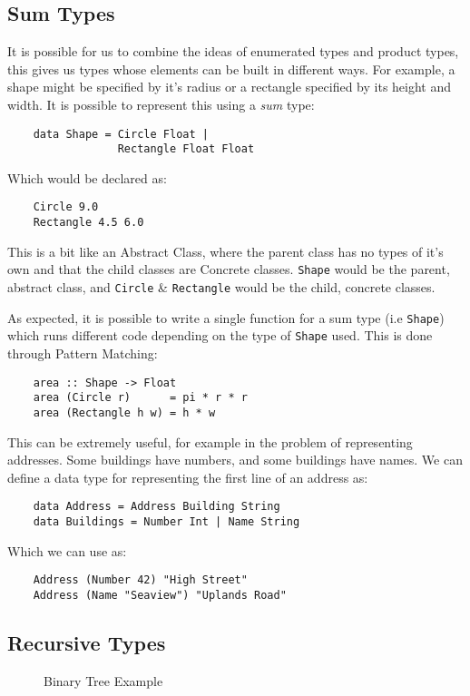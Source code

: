 \subsection{Sum Types}
It is possible for us to combine the ideas of enumerated types and product types, this gives us types whose elements can be built in different ways. For example, a shape might be specified by it's radius or a rectangle specified by its height and width. It is possible to represent this using a \textit{sum} type:
\begin{verbatim}
    data Shape = Circle Float |
                 Rectangle Float Float
\end{verbatim}
Which would be declared as:
\begin{verbatim}
    Circle 9.0
    Rectangle 4.5 6.0
\end{verbatim}

This is a bit like an Abstract Class, where the parent class has no types of it's own and that the child classes are Concrete classes. \verb|Shape| would be the parent, abstract class, and \verb|Circle| \& \verb|Rectangle| would be the child, concrete classes. 

As expected, it is possible to write a single function for a sum type (i.e \verb|Shape|) which runs different code depending on the type of \verb|Shape| used. This is done through Pattern Matching:
\begin{verbatim}
    area :: Shape -> Float
    area (Circle r)      = pi * r * r
    area (Rectangle h w) = h * w
\end{verbatim}

This can be extremely useful, for example in the problem of representing addresses. Some buildings have numbers, and some buildings have names. We can define a data type for representing the first line of an address as:
\begin{verbatim}
    data Address = Address Building String
    data Buildings = Number Int | Name String
\end{verbatim}
Which we can use as:
\begin{verbatim}
    Address (Number 42) "High Street"
    Address (Name "Seaview") "Uplands Road"
\end{verbatim}

\subsection{Recursive Types}

\begin{figure}[ht]
    \centering
    \caption{Binary Tree Example}
\end{figure}

